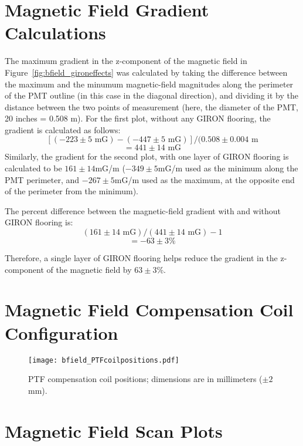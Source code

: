 
\appendix

\section{Magnetic Field Gradient Calculations}
\label{Appendix:MagneticFieldGradientCalculations}

The maximum gradient in the z-component of the magnetic field in Figure~\ref{fig:bfield_gironeffects} was calculated by taking the difference between the maximum and the minumum magnetic-field magnitudes along the perimeter of the PMT outline (in this case in the diagonal direction), and dividing it by the distance between the two points of measurement (here, the diameter of the PMT, 20 inches = 0.508 m).
For the first plot, without any GIRON flooring, the gradient is calculated as follows:
\[[(-223\pm5 \text{ mG}) - (-447\pm5 \text{ mG})]/ (0.508\pm0.004 \text{ m}\]
\[=441\pm14 \text{ mG} \]
Similarly, the gradient for the second plot, with one layer of GIRON flooring is calculated to be $ 161\pm14 $mG/m ($ -349\pm5 $mG/m used as the minimum along the PMT perimeter, and $ -267\pm5 $mG/m used as the maximum, at the opposite end of the perimeter from the minimum).

The percent difference between the magnetic-field gradient with and without GIRON flooring is:
\[(161\pm14 \text{ mG})/(441\pm14 \text{ mG}) - 1\]
\[=-63\pm3\%\]

Therefore, a single layer of GIRON flooring helps reduce the gradient in the z-component of the magnetic field by $ 63\pm3 $\%.

\section{Magnetic Field Compensation Coil Configuration}
\label{Appendix:CoilPositions}
%
\begin{figure}[H]
  \begin{center}
  \texttt{[image: bfield\_PTFcoilpositions.pdf]}
  \caption{PTF compensation coil positions; dimensions are in millimeters ($\pm2$mm).}
  \label{fig:coilpos}
  \end{center}
\end{figure}
%

\newpage

\section{Magnetic Field Scan Plots}
\label{Appendix:MagneticFieldScanPlots}

